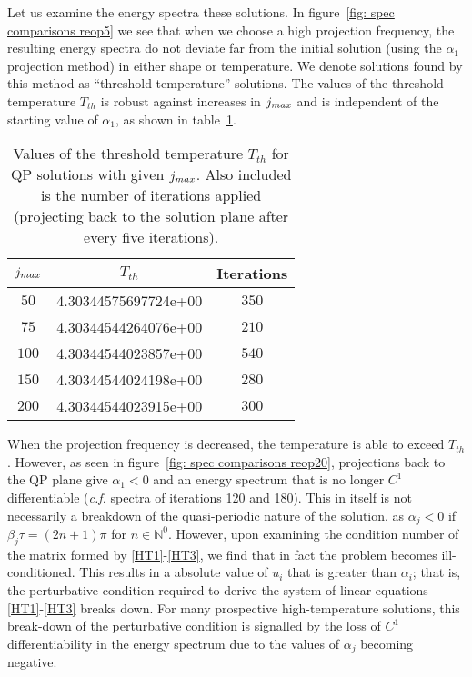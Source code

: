 \documentclass[../PhD.tex]{subfiles}
\begin{document}
Let us examine the energy spectra these solutions. In figure~\ref{fig: spec comparisons reop5} we see that when we choose a high projection frequency, the resulting energy spectra do not deviate far from the initial solution (using the $\alpha_1$ projection method) in either shape or temperature. We denote solutions found by this method as ``threshold temperature'' solutions. The values of the threshold temperature $T_{th}$ is robust against increases in $j_{max}$ and is independent of the starting value of $\alpha_1$, as shown in table~\ref{tab: T_thresh}.

\begin{table}[h]
	\centering
	\begin{tabular}[t]{|c|c|c|}
		\hline
		$j_{max}$ & $T_{th}$ & Iterations \\ \hline
		$50$ & 4.30344575697724e+00 & $350$ \\ \hline
		$75$ & 4.30344544264076e+00 & $210$ \\ \hline
		$100$ & 4.30344544023857e+00 & $540$ \\ \hline
		$150$ & 4.30344544024198e+00 & $280$ \\ \hline
		$200$ & 4.30344544023915e+00 & $300$ \\ \hline
	\end{tabular}
	\caption[Threshold temperatures for different truncation values with constant projection frequency]{Values of the threshold temperature $T_{th}$ for QP solutions with given $j_{max}$. Also included is the number of iterations applied (projecting back to the solution plane after every five iterations).}
	\label{tab: T_thresh}
\end{table}

When the projection frequency is decreased, the temperature is able to exceed $T_{th}$. However, as seen in figure~\ref{fig: spec comparisons reop20}, projections back to the QP plane give $\alpha_1 < 0$ and an energy spectrum that is no longer $C^1$ differentiable ({\it c.f.} spectra of iterations 120 and 180). This in itself is not necessarily a breakdown of the quasi-periodic nature of the solution, as $\alpha_j < 0$ if {$\beta_j \tau = (2n + 1) \pi$} for {$n \in \mathbb{N}^0$}. However, upon examining the condition number of the matrix formed by \eqref{HT1}-\eqref{HT3}, we find that in fact the problem becomes ill-conditioned. This results in a absolute value of $u_i$ that is greater than $\alpha_i$; that is, the perturbative condition required to derive the system of linear equations \eqref{HT1}-\eqref{HT3} breaks down. For many prospective high-temperature solutions, this break-down of the perturbative condition is signalled by the loss of $C^1$ differentiability in the energy spectrum due to the values of $\alpha_j$ becoming negative. 
\end{document}
